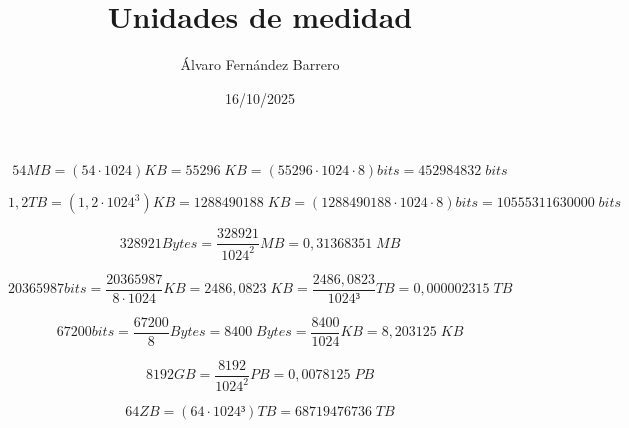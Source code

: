 \documentclass[12pt]{article}
\title{Unidades de medidad}
\author{Álvaro Fernández Barrero}
\date{16/10/2025}
\begin{document}
\maketitle

\[
    54 MB = (54 \cdot 1024) KB = 55296 \; KB = (55296 \cdot 1024 \cdot 8) bits = 452984832 \; bits
\]

\[
    1,2 TB = (1,2 \cdot 1024^3) KB = 1288490188 \; KB = (1288490188 \cdot 1024 \cdot 8) bits = 10555311630000 \; bits
\]

\[
    328921 Bytes = \frac{328921}{1024^2} MB = 0,31368351 \; MB
\]

\[
     20365987 bits = \frac{20365987}{8 \cdot 1024} KB = 2486,0823 \; KB = \frac{2486,0823}{1024³} TB = 0,000002315 \; TB
\]

\[
    67200 bits = \frac{67200}{8} Bytes = 8400 \; Bytes = \frac{8400}{1024} KB = 8,203125 \; KB
\]

\[
    8192 GB = \frac{8192}{1024^2} PB = 0,0078125 \; PB
\] 

\[
    64 ZB = (64 \cdot 1024³) TB = 68719476736 \; TB
\]
\end{document}
